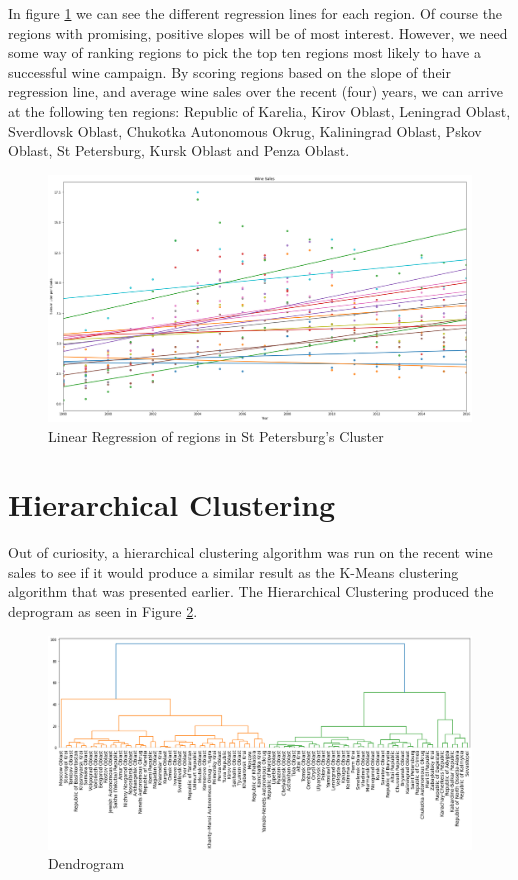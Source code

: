 \documentclass{article}
\begin{document}
\noindent In figure \ref{fig:Cluster 0 Linear Regression} we can see the different regression lines for each region. Of course the regions with promising, positive slopes will be of most interest. However, we need some way of ranking regions to pick the top ten regions most likely to have a successful wine campaign. By scoring regions based on the slope of their regression line, and average wine sales over the recent (four) years, we can arrive at the following ten regions: Republic of Karelia, Kirov Oblast, Leningrad Oblast, Sverdlovsk Oblast, Chukotka Autonomous Okrug, Kaliningrad Oblast, Pskov Oblast, St Petersburg, Kursk Oblast and Penza Oblast. 


\begin{figure}[!htb]
    \centering
    \includegraphics[scale = .3]{Graphs/linear regression.png}
    \caption{Linear Regression of regions in St Petersburg's Cluster}
    \label{fig:Cluster 0 Linear Regression}
\end{figure}

\section{Hierarchical Clustering}

Out of curiosity, a hierarchical clustering algorithm was run on the recent wine sales to see if it would produce a similar result as the K-Means clustering algorithm that was presented earlier. The Hierarchical Clustering produced the deprogram as seen in Figure \ref{fig:dendrogram}.


\begin{figure}[!htb]
    \centering
    \includegraphics[scale = .35]{Graphs/dendrogram.png}
    \caption{Dendrogram}
    \label{fig:dendrogram}
\end{figure}
\end{document}
